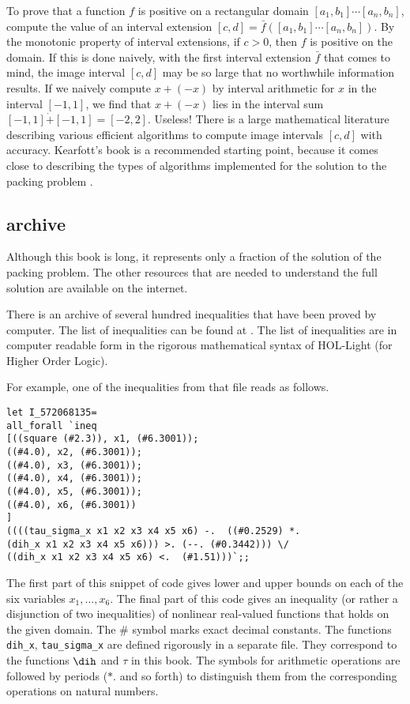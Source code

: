 To prove that a function $f$ is positive on a rectangular domain
$[a_1,b_1]\cdots[a_n,b_n]$, compute the
value of an interval extension $[c,d]=\bar f([a_1,b_1]\cdots[a_n,b_n])$.
By the monotonic property of interval extensions, if $c>0$, then $f$
is positive on the domain.  If this is done naively, with the
first interval extension $\bar f$ that comes to mind, the image interval
$[c,d]$ may be so large that no worthwhile information results.
If we naively 
compute $x+(-x)$ by interval arithmetic for $x$ in the interval $[-1,1]$,
we find that $x+(-x)$ lies in the interval sum
$[-1,1]\dot + [-1,1] = [-2,2]$.  Useless!
There is a large mathematical literature describing various 
efficient algorithms
to compute image intervals $[c,d]$ with accuracy.
Kearfott's book is a recommended starting point, because it comes
close to describing the types of algorithms implemented for the
solution to the packing problem \cite{Kea96}. 



\subsection{archive}

Although this book is long, it represents only a fraction of the
solution of the packing problem.  The other resources that are needed
to understand the full solution are available on the internet.

There is an archive of several hundred inequalities that have been
proved by computer.  The list of inequalities can be found at
\cite{web}. The list
of inequalities are in computer readable form in the rigorous
mathematical syntax of HOL-Light (for Higher Order Logic).

For example, one of the inequalities from that file reads as follows.
\begin{verbatim}
let I_572068135=
all_forall `ineq 
[((square (#2.3)), x1, (#6.3001));
((#4.0), x2, (#6.3001));
((#4.0), x3, (#6.3001));
((#4.0), x4, (#6.3001));
((#4.0), x5, (#6.3001));
((#4.0), x6, (#6.3001))
]
((((tau_sigma_x x1 x2 x3 x4 x5 x6) -.  ((#0.2529) *.  
(dih_x x1 x2 x3 x4 x5 x6))) >. (--. (#0.3442))) \/ 
((dih_x x1 x2 x3 x4 x5 x6) <.  (#1.51)))`;;
\end{verbatim}
The first part of this snippet of code gives lower and upper bounds on
each of the six variables $x_1,\ldots,x_6$.  The final part of this
code gives an inequality (or rather a disjunction of two inequalities)
of nonlinear real-valued functions that holds on the given domain.
The $\#$ symbol marks exact decimal constants.  The functions {\tt
  dih\_x}, {\tt tau\_sigma\_x} are defined rigorously in a separate
file.  They correspond to the functions $\dih$ and $\tau$ in this
book.  The symbols for arithmetic operations are followed by periods
($*.$ and so forth) to distinguish them from the corresponding
operations on natural numbers.

